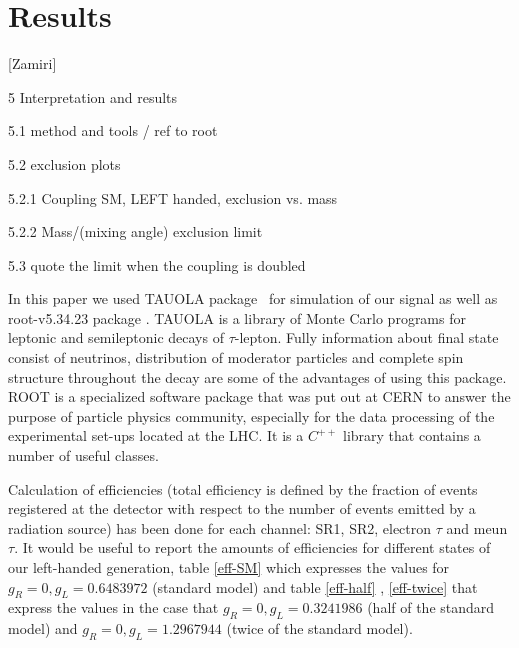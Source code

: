 \section{Results}\label{sec:results} 

[Zamiri]

5 Interpretation and results

5.1 method and tools / ref to root

5.2 exclusion plots

5.2.1 Coupling SM, LEFT handed, exclusion vs. mass

5.2.2 Mass/(mixing angle) exclusion limit

5.3 quote the limit when the coupling is doubled


In this paper we used TAUOLA package~\cite{Davidson:2010rw,Jadach:1990mz,Golonka:2003xt,Jadach:1993hs} for simulation of our signal as well as root-v5.34.23 package \cite{Brun:1997pa}. TAUOLA is a library of Monte Carlo programs for leptonic and semileptonic decays of $\tau$-lepton. Fully information about final state consist of neutrinos, distribution of moderator particles and complete spin structure throughout the decay are some of the advantages of using this package. ROOT is a specialized software package that was put out at CERN to answer the purpose of particle physics community, especially for the data processing of the experimental set-ups located at the LHC. It is a $C^{++}$ library that contains a number of useful classes.  

 Calculation of efficiencies (total efficiency is defined by the fraction of events registered at the detector with respect to the number of events emitted by a radiation source) has been done for each channel: SR1, SR2, electron $\tau$ and meun $\tau$. It would be useful to report the amounts of efficiencies for different states of our left-handed generation, table \ref{eff-SM}  which expresses the values for  $ g_R=0 , g_L=0.6483972 $ (standard model) and table \ref{eff-half} , \ref{eff-twice} that express the values in the case that  $ g_R=0 , g_L=0.3241986 $ (half of the standard model) and $ g_R=0 , g_L=1.2967944 $ (twice of the standard model).

